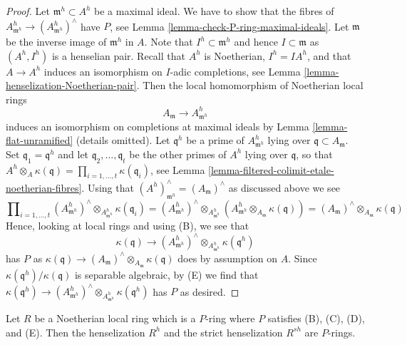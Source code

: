 \begin{proof}
Let $\mathfrak m^h \subset A^h$ be a maximal ideal. We have to show
that the fibres of $A^h_{\mathfrak m^h} \to (A^h_{\mathfrak m^h})^\wedge$
have $P$, see Lemma \ref{lemma-check-P-ring-maximal-ideals}.
Let $\mathfrak m$ be the inverse image of $\mathfrak m^h$ in $A$.
Note that $I^h \subset \mathfrak m^h$ and hence $I \subset \mathfrak m$
as $(A^h, I^h)$ is a henselian pair. Recall that $A^h$ is Noetherian,
$I^h = IA^h$, and that $A \to A^h$ induces an isomorphism on
$I$-adic completions, see
Lemma \ref{lemma-henselization-Noetherian-pair}.
Then the local homomorphism of Noetherian local rings
$$
A_\mathfrak m \to A^h_{\mathfrak m^h}
$$
induces an isomorphism on completions at maximal ideals by
Lemma \ref{lemma-flat-unramified} (details omitted).
Let $\mathfrak q^h$ be a prime of $A^h_{\mathfrak m^h}$ lying
over $\mathfrak q \subset A_\mathfrak m$.
Set $\mathfrak q_1 = \mathfrak q^h$
and let $\mathfrak q_2, \ldots, \mathfrak q_t$
be the other primes of $A^h$ lying over $\mathfrak q$, so that
$A^h \otimes_A \kappa(\mathfrak q) =
\prod\nolimits_{i = 1, \ldots, t} \kappa(\mathfrak q_i)$, see
Lemma \ref{lemma-filtered-colimit-etale-noetherian-fibres}.
Using that $(A^h)_{\mathfrak m^h}^\wedge = (A_\mathfrak m)^\wedge$
as discussed above we see
$$
\prod\nolimits_{i = 1, \ldots, t}
(A^h_{\mathfrak m^h})^\wedge \otimes_{A^h_{\mathfrak m^h}}
\kappa(\mathfrak q_i) =
(A^h_{\mathfrak m^h})^\wedge \otimes_{A^h_{\mathfrak m^h}}
(A^h_{\mathfrak m^h} \otimes_{A_{\mathfrak m}} \kappa(\mathfrak q)) =
(A_{\mathfrak m})^\wedge \otimes_{A_{\mathfrak m}} \kappa(\mathfrak q)
$$
Hence, looking at local rings and using (B), we see that
$$
\kappa(\mathfrak q) \longrightarrow
(A^h_{\mathfrak m^h})^\wedge \otimes_{A^h_{\mathfrak m^h}}
\kappa(\mathfrak q^h)
$$
has $P$ as
$\kappa(\mathfrak q) \to
(A_\mathfrak m)^\wedge \otimes_{A_\mathfrak m} \kappa(\mathfrak q)$
does by assumption on $A$. Since $\kappa(\mathfrak q^h)/\kappa(\mathfrak q)$
is separable algebraic, by (E) we find that
$\kappa(\mathfrak q^h) \to
(A^h_{\mathfrak m^h})^\wedge \otimes_{A^h_{\mathfrak m^h}}
\kappa(\mathfrak q^h)$ has $P$ as desired.
\end{proof}

\begin{lemma}
\label{lemma-henselization-P-ring}
Let $R$ be a Noetherian local ring which is a $P$-ring where $P$
satisfies (B), (C), (D), and (E). Then the henselization $R^h$
and the strict henselization $R^{sh}$ are $P$-rings.
\end{lemma}

